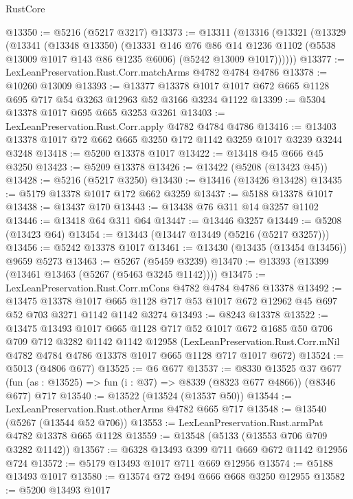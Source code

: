 \begin{lexlean}{RustCore}
\begin{coremodule}
@13350 := @5216 (@5217 @3217)
@13373 := @13311
    (@13316
      (@13321
        (@13329
          (@13341
            (@13348 @13350)
            (@13331
              @146
              @76
              @86
              @14
              @1236
              @1102
              (@5538 @13009 @1017 @143 @86 @1235 @6006)
              (@5242 @13009 @1017))))))
@13377 := LexLeanPreservation.Rust.Corr.matchArms @4782 @4784 @4786
@13378 := @10260 @13009
@13393 := @13377 @13378 @1017 @1017 @672 @665 @1128 @695 @717 @54 @3263 @12963 @52 @3166 @3234 @1122
@13399 := @5304 @13378 @1017 @695 @665 @3253 @3261
@13403 := LexLeanPreservation.Rust.Corr.apply @4782 @4784 @4786
@13416 := @13403 @13378 @1017 @72 @662 @665 @3250 @172 @1142 @3259 @1017 @3239 @3244 @3248
@13418 := @5200 @13378 @1017
@13422 := @13418 @45 @666 @45 @3250
@13423 := @5209 @13378
@13426 := @13422 (@5208 (@13423 @45))
@13428 := @5216 (@5217 @3250)
@13430 := @13416 (@13426 @13428)
@13435 := @5179 @13378 @1017 @172 @662 @3259
@13437 := @5188 @13378 @1017
@13438 := @13437 @170
@13443 := @13438 @76 @311 @14 @3257 @1102
@13446 := @13418 @64 @311 @64
@13447 := @13446 @3257
@13449 := @5208 (@13423 @64)
@13454 := @13443 (@13447 @13449 (@5216 (@5217 @3257)))
@13456 := @5242 @13378 @1017
@13461 := @13430 (@13435 (@13454 @13456)) @9659 @5273
@13463 := @5267 (@5459 @3239)
@13470 := @13393 (@13399 (@13461 @13463 (@5267 (@5463 @3245 @1142))))
@13475 := LexLeanPreservation.Rust.Corr.mCons @4782 @4784 @4786 @13378
@13492 := @13475
    @13378
    @1017
    @665
    @1128
    @717
    @53
    @1017
    @672
    @12962
    @45
    @697
    @52
    @703
    @3271
    @1142
    @1142
    @3274
@13493 := @8243 @13378
@13522 := @13475
    @13493
    @1017
    @665
    @1128
    @717
    @52
    @1017
    @672
    @1685
    @50
    @706
    @709
    @712
    @3282
    @1142
    @1142
    @12958
    (LexLeanPreservation.Rust.Corr.mNil @4782 @4784 @4786 @13378 @1017 @665 @1128 @717 @1017 @672)
@13524 := @5013 (@4806 @677)
@13525 := @6 @677
@13537 := @8330
    @13525
    @37
    @677
    (fun (as : @13525) => fun (i : @37) => @8339 (@8323 @677 @4866))
    (@8346 @677)
    @717
@13540 := @13522 (@13524 (@13537 @50))
@13544 := LexLeanPreservation.Rust.otherArms @4782 @665 @717
@13548 := @13540 (@5267 (@13544 @52 @706))
@13553 := LexLeanPreservation.Rust.armPat @4782 @13378 @665 @1128
@13559 := @13548 (@5133 (@13553 @706 @709 @3282 @1142))
@13567 := @6328 @13493 @399 @711 @669 @672 @1142 @12956 @724
@13572 := @5179 @13493 @1017 @711 @669 @12956
@13574 := @5188 @13493 @1017
@13580 := @13574 @72 @494 @666 @668 @3250 @12955
@13582 := @5200 @13493 @1017

\end{coremodule}
\end{lexlean}
